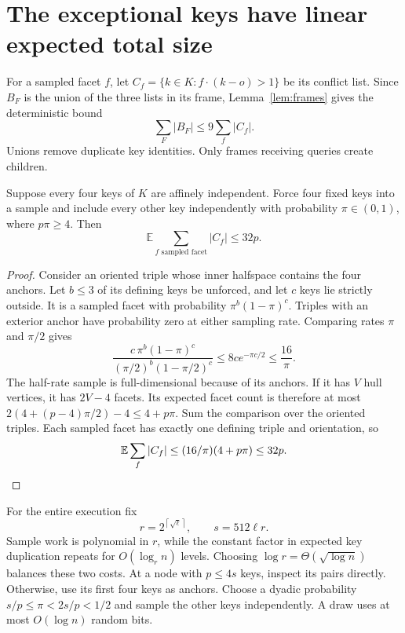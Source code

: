 \documentclass[notab,a4paper,UKenglish,numberwithinsect]{socg-lipics-v2021}
\newcommand{\ceil}[1]{\left\lceil #1\right\rceil}
\begin{document}
\section{The exceptional keys have linear expected total size}\label{sec:sampling}
For a sampled facet $f$, let
$C_f=\{k\in K:f\cdot(k-o)>1\}$ be its conflict list. Since $B_F$ is the union of the three lists in its frame, Lemma~\ref{lem:frames} gives the deterministic bound
\begin{equation}\label{eq:copies}
 \sum_F|B_F|\le9\sum_f|C_f|.
\end{equation}
Unions remove duplicate key identities. Only frames receiving queries create children.

\begin{lemma}\label{lem:conflicts}
Suppose every four keys of $K$ are affinely independent. Force four fixed keys into a sample and include every other key independently with probability $\pi\in(0,1)$, where $p\pi\ge4$. Then
\[
 \mathbb E\sum_{f\text{ sampled facet}}|C_f|\le32p.
\]
\end{lemma}
\begin{proof}
Consider an oriented triple whose inner halfspace contains the four anchors. Let $b\le3$ of its defining keys be unforced, and let $c$ keys lie strictly outside. It is a sampled facet with probability $\pi^b(1-\pi)^c$. Triples with an exterior anchor have probability zero at either sampling rate. Comparing rates $\pi$ and $\pi/2$ gives
\[
 \frac{c\,\pi^b(1-\pi)^c}{(\pi/2)^b(1-\pi/2)^c}
 \le8c e^{-\pi c/2}\le\frac{16}{\pi}.
\]
The half-rate sample is full-dimensional because of its anchors. If it has $V$ hull vertices, it has $2V-4$ facets. Its expected facet count is therefore at most
$2(4+(p-4)\pi/2)-4\le4+p\pi$.
Sum the comparison over the oriented triples. Each sampled facet has exactly one defining triple and orientation, so
\[
 \mathbb E\sum_f|C_f|
 \le(16/\pi)(4+p\pi)\le32p.\qedhere
\]
\end{proof}

For the entire execution fix
\begin{equation}\label{eq:parameters}
 r=2^{\ceil{\sqrt{\ell}}},\qquad s=512\ell r.
\end{equation}
Sample work is polynomial in $r$, while the constant factor in expected key duplication repeats for $O(\log_r n)$ levels. Choosing $\log r=\Theta(\sqrt{\log n})$ balances these two costs.
At a node with $p\le4s$ keys, inspect its pairs directly. Otherwise, use its first four keys as anchors. Choose a dyadic probability
$s/p\le\pi<2s/p<1/2$ and sample the other keys independently. A draw uses at most $O(\log n)$ random bits.
\end{document}
